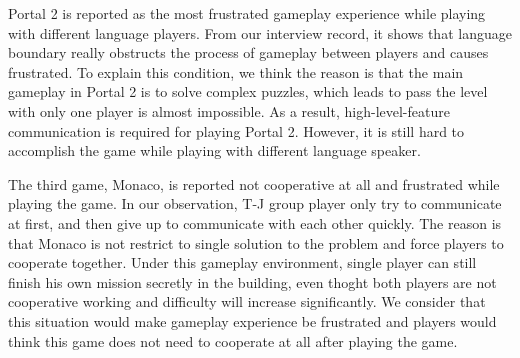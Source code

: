 Portal 2 is reported as the most frustrated gameplay experience while playing with different language players. From our interview record, it shows that language boundary really obstructs the process of gameplay between players and causes frustrated. To explain this condition, we think the reason is that the main gameplay in Portal 2 is to solve complex puzzles, which leads to pass the level with only one player is almost impossible. As a result, high-level-feature communication is required for playing Portal 2. However, it is still hard to accomplish the game while playing with different language speaker.



The third game, Monaco, is reported not cooperative at all and frustrated while playing the game. In our observation, T-J group player only try to communicate at first, and then give up to communicate with each other quickly. The reason is that Monaco is not restrict to single solution to the problem and force players to cooperate together. Under this gameplay environment, single player can still finish his own mission secretly in the building, even thoght both players are not cooperative working and difficulty will increase significantly. We consider that this situation would make gameplay experience be frustrated and players would think this game does not need to cooperate at all after playing the game.

